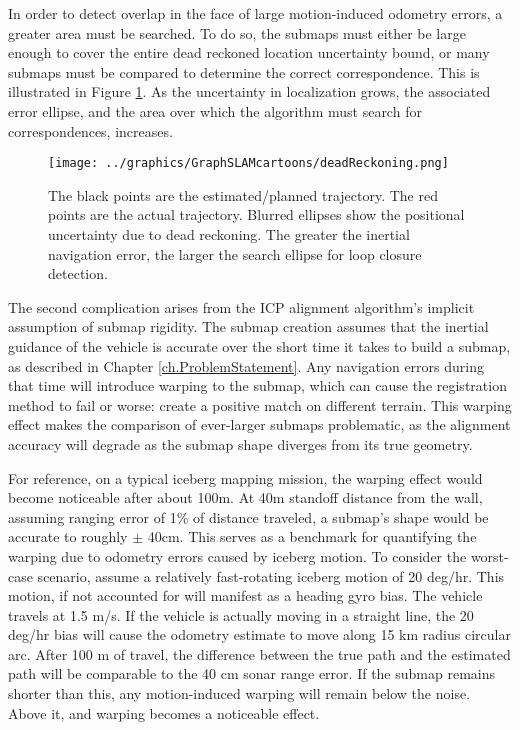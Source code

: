 
In order to detect overlap in the face of large motion-induced odometry errors, a greater area must be searched. To do so, the submaps must either be large enough to cover the entire dead reckoned location uncertainty bound, or many submaps must be compared to determine the correct correspondence. This is illustrated in Figure \ref{fig:BathyMapping3}. As the uncertainty in localization grows, the associated error ellipse, and the area over which the algorithm must search for correspondences, increases.

 \begin{figure}[htb]
   \centering
   \texttt{[image: ../graphics/GraphSLAMcartoons/deadReckoning.png]} %
   \caption{The black points are the estimated/planned trajectory. The red points are the actual trajectory. Blurred ellipses show the positional uncertainty due to dead reckoning. The greater the inertial navigation error, the larger the search ellipse for loop closure detection.  }
   \label{fig:BathyMapping3}
\end{figure}

The second complication arises from the ICP alignment algorithm's implicit assumption of submap rigidity. The submap creation assumes that the inertial guidance of the vehicle is accurate over the short time it takes to build a submap, as described in Chapter \ref{ch.ProblemStatement}. Any navigation errors during that time will introduce warping to the submap, which can cause the registration method to fail or worse: create a positive match on different terrain. This warping effect makes the comparison of ever-larger submaps problematic, as the alignment accuracy will degrade as the submap shape diverges from its true geometry.

For reference, on a typical iceberg mapping mission, the warping effect would become noticeable after about 100m. At 40m standoff distance from the wall, assuming ranging error of 1\% of distance traveled, a submap's shape would be accurate to roughly $\pm$ 40cm. This serves as a benchmark for quantifying the warping due to odometry errors caused by iceberg motion. To consider the worst-case scenario, assume a relatively fast-rotating iceberg motion of 20 deg/hr. This motion, if not accounted for will manifest as a heading gyro bias. The vehicle travels at 1.5 m/s. If the vehicle is actually moving in a straight line, the 20 deg/hr bias will cause the odometry estimate to move along 15 km radius circular arc. After 100 m of travel, the difference between the true path and the estimated path will be comparable to the 40 cm sonar range error. If the submap remains shorter than this, any motion-induced warping will remain below the noise. Above it, and warping becomes a noticeable effect.

